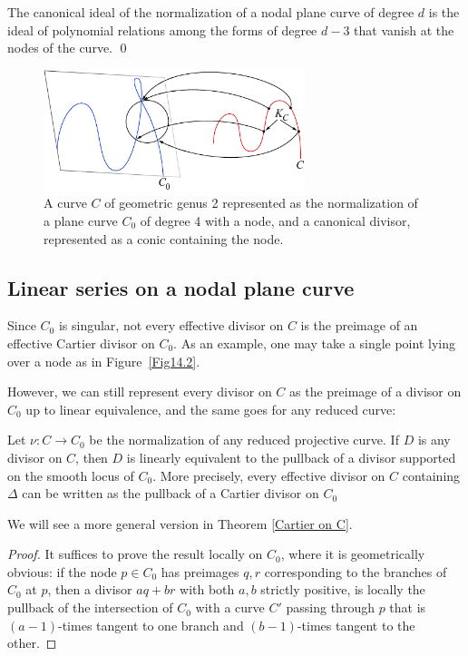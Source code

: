 \begin{corollary}
 The canonical ideal of the normalization of a nodal plane curve of degree $d$ is the ideal of polynomial relations
 among the forms of degree $d-3$ that vanish at the nodes of the curve. \qed
\end{corollary}

\begin{figure}
\centerline {\includegraphics[width=3in]{"main/Fig14-2"}}
\caption{A curve $C$ of geometric genus 2 represented as the normalization of a plane curve $C_{0}$ of degree 4 with a node, and a canonical divisor, represented as a conic containing the node.}
\label{canonical on normalization}
\end{figure}

\subsection{Linear series on a nodal plane curve}\label{linear series on nodal plane curves}

Since $C_{0}$ is singular, not every effective divisor on $C$ is the preimage of an
effective Cartier divisor on $C_{0}$. As an example, one may take a single point lying over a node
as in Figure~\ref{Fig14.2}. 

However,
we can still represent every divisor on $C$ as the preimage of a divisor on $C_{0}$ up to linear
equivalence, and the same goes for any reduced curve:

\begin{lemma}
Let $\nu: C\to C_{0}$ be the normalization of any reduced projective curve. If $D$ is any divisor
on $C$, then $D$ is linearly equivalent to the pullback of a divisor supported on the smooth locus of  $C_{0}$. More precisely,  every effective divisor on $C$ containing $\Delta$ can be written as the pullback
of a Cartier divisor on $C_{0}$\end{lemma}

We will see a more general version in Theorem \ref{Cartier on C}.

\begin{proof}
It suffices to prove the result locally on $C_{0}$, where it is geometrically obvious:  if the node
$p\in C_{0}$ has preimages $q,r$ corresponding to the branches of $C_{0}$ at $p$, then
a divisor $aq+br$ with both $a,b$ strictly positive, is locally the pullback of the intersection of $C_{0}$
with a curve $C'$ passing through $p$  that is $(a-1)$-times tangent to one branch and
$(b-1)$-times tangent to the other.
\end{proof}


